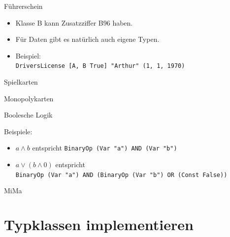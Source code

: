 \documentclass{beamer}
\begin{document}
\begin{frame}{Führerschein}

  \vfill

  \begin{itemize}
    \item Klasse B kann Zusatzziffer B96 haben.
    \item Für Daten gibt es natürlich auch eigene Typen.
    \item Beispiel:\\
          \texttt{DriversLicense [A, B True] "{}Arthur"{} (1, 1, 1970)}
  \end{itemize}
\end{frame}

\begin{frame}{Spielkarten}
\end{frame}

\begin{frame}{Monopolykarten}
\end{frame}

\begin{frame}{Boolesche Logik}

  \vfill

  Beispiele:
  \begin{itemize}
    \item $a \wedge b$ entspricht \texttt{BinaryOp (Var "{}a"{}) AND (Var "{}b"{})}
    \item $a \vee (b \wedge 0)$ entspricht\\
          \texttt{BinaryOp (Var "{}a"{}) AND (BinaryOp (Var "{}b"{}) OR (Const False))}
  \end{itemize}
\end{frame}

\begin{frame}{MiMa}
\end{frame}

\section{Typklassen implementieren}
\end{document}
